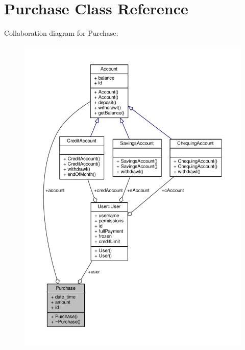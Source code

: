 \hypertarget{classPurchase}{\section{Purchase Class Reference}
\label{classPurchase}
}


Collaboration diagram for Purchase\-:
\nopagebreak
\begin{figure}[H]
\begin{center}
\leavevmode
\includegraphics[width=350pt]{classPurchase__coll__graph}
\end{center}
\end{figure}
